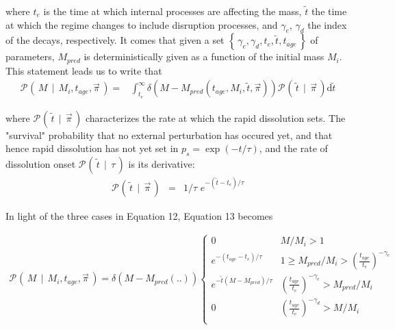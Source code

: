 \documentclass[a4paper]{article}
\newcommand{\given}{\ensuremath{\,\mid\,}}
\newcommand{\proba}[2][]{\ensuremath{\mathcal{P}_{#1}\left(\, #2 \,\right)}}
\newcommand{\set}[1]{\ensuremath{\left\{\,#1\,\right\}}}
\newcommand{\tage}{\ensuremath{t_{age}}}
\newcommand{\Mi}{\ensuremath{M_{i}}}
\newcommand{\ts}{\ensuremath{\tilde{t}}} %
\newcommand{\PI}{\ensuremath{\overrightarrow{\pi}}} %
\newcommand{\dif}{\ensuremath{\text{d}}} %
\begin{document}
where $t_e$ is the time at which internal processes are affecting the mass, $\ts$ the time at which the regime changes to include disruption processes, and $\gamma_e$, $\gamma_d$ the index of the decays, respectively. It comes that given a set $\set{\gamma_e, \gamma_d, t_e, \ts, \tage}$ of parameters, $M_{pred}$ is deterministically given as a function of the initial mass $M_i$. 
This statement leads us to write that
\begin{eqnarray}
\proba{M\given \Mi, \tage, \PI} =& \int_{t_e}^{\infty} \delta\left(M-M_{pred}( \tage, \Mi, \ts, \PI)\right)\proba{\ts\given\PI}\dif\ts
\end{eqnarray}

where $\proba{\ts \given \PI}$ characterizes the rate at which the rapid dissolution sets. The "survival" probability that no external perturbation has occured yet, and that hence rapid dissolution has not yet set in $p_s=\exp{(-t/\tau)}$, and the rate of dissolution onset \proba{\ts\given\tau} is its derivative:
\begin{eqnarray}
\proba{\ts\given\PI} & = &
1/\tau\,\, e^{-(\ts-t_e)/\tau}
\end{eqnarray}

In light of the three cases in Equation 12,  Equation 13 becomes

%
\begin{eqnarray}
\proba{M\given \Mi, \tage, \PI} = \delta(M-M_{pred}(..))
   \begin{cases}
   0 & M/\Mi >1 \\
   e^{-(\tage-t_e)/\tau}& 1\ge M_{pred}/\Mi > \left(\frac{\tage}{t_e}\right)^{-\gamma_e}\\
   e^{-\ts(M-M_{pred})/\tau}& \left(\frac{\tage}{t_e}\right)^{-\gamma_e}>M_{pred}/\Mi\\
 0 & \left(\frac{\tage}{t_e}\right)^{-\gamma_d}>M/\Mi\\
   \end{cases}
\end{eqnarray}
\end{document}
